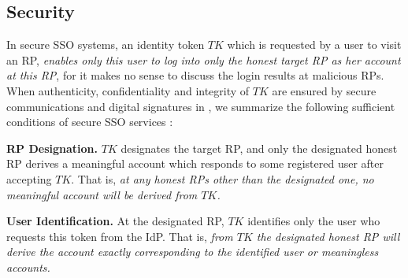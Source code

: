\subsection{Security}
\label{analysis-security}

In secure SSO systems, an identity token $TK$ which is requested by a user to visit an RP,
    \emph{enables only this user to log into only the honest target RP as her account at this RP}, for it makes no sense to discuss the login results at malicious RPs.
When authenticity, confidentiality and integrity of $TK$ are ensured by secure communications and digital signatures in \usso, we summarize the following sufficient conditions of secure SSO services \cite{FettKS14,BrowserID,SPRESSO}:

\noindent \textbf{RP Designation.} $TK$ designates the target RP,
    and only the designated honest RP derives a meaningful account which responds to some registered user after accepting $TK$.
That is, \emph{at any honest RPs other than the designated one, no meaningful account will be derived from $TK$.}

\noindent \textbf{User Identification.} At the designated RP, $TK$ identifies only the user who requests this token from the IdP. That is, \emph{from $TK$ the designated honest RP will derive the account exactly corresponding to the identified user or meaningless accounts.}



